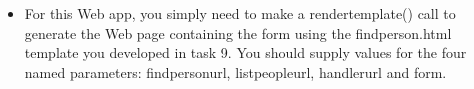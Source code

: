 \documentclass{beamer}
\begin{document}
	\begin{frame}
        \begin{itemize}
            \item For this Web app, you simply need to make a render\textunderscore{}template() call to generate the Web page containing the form using the find\textunderscore{}person.html template you developed in task 9. You should supply values for the four named parameters: find\textunderscore{}person\textunderscore{}url, list\textunderscore{}people\textunderscore{}url, handler\textunderscore{}url and form.

		\end{itemize}
	\end{frame}
\end{document}
